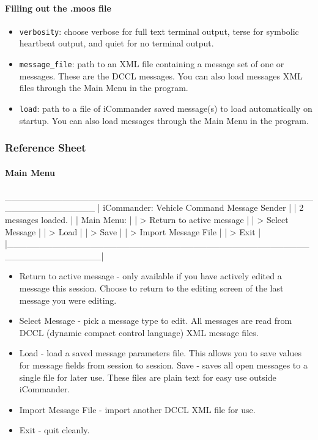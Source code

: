 \documentclass[11pt, letterpaper, oneside]{memoir}
\begin{document}
\paragraph{Filling out the .moos file}
\begin{itemize}
\item \verb|verbosity|: choose verbose for full text terminal output, terse for symbolic heartbeat output, and quiet for no terminal output.
\item \verb|message_file|: path to an XML file containing a message set of one or messages. These are the DCCL messages. You can also load messages XML files through the Main Menu in the program.
\item \verb|load|: path to a file of iCommander saved message(s) to load automatically on startup. You can also load messages through the Main Menu in the program.
\end{itemize}

\subsubsection{Reference Sheet}
\paragraph{Main Menu}
\begin{boxedverbatim}
 ______________________________________________________________
|            iCommander: Vehicle Command Message Sender        |
|                        2 messages loaded.                    |
|    Main Menu:                                                |
|    > Return to active message                                |
|    > Select Message                                          |
|    > Load                                                    |
|    > Save                                                    |
|    > Import Message File                                     |
|    > Exit                                                    |
|______________________________________________________________|
\end{boxedverbatim}
\resetbvlinenumber
\begin{itemize}
\item Return to active message - only available if you have actively edited a message this session. Choose to return to the editing screen of the last message you were editing.
\item Select Message - pick a message type to edit. All messages are read from DCCL (dynamic compact control language) XML message files.
\item Load - load a saved message parameters file. This allows you to save values for message fields from session to session.
\fitem Save - saves all open messages to a single file for later use. These files are plain text for easy use outside iCommander.
\item Import Message File - import another DCCL XML file for use.
\item Exit - quit cleanly.
\end{itemize}
\end{document}
